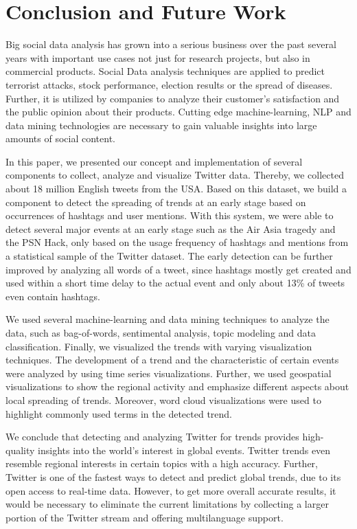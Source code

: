 
\chapter{Conclusion and Future Work}
\label{cha:conclusion-future-work}
Big social data analysis has grown into a serious business over the past several years with important use cases not just for research projects, but also in commercial products. Social Data analysis techniques are applied to predict terrorist attacks, stock performance, election results or the spread of diseases. Further, it is utilized by companies to analyze their customer’s satisfaction and the public opinion about their products. Cutting edge machine-learning, NLP and data mining technologies are necessary to gain valuable insights into large amounts of social content.

In this paper, we presented our concept and implementation of several components to collect, analyze and visualize Twitter data. Thereby, we collected about 18 million English tweets from the USA. Based on this dataset, we build a component to detect the spreading of trends at an early stage based on occurrences of hashtags and user mentions. With this system, we were able to detect several major events at an early stage such as the Air Asia tragedy and the PSN Hack, only based on the usage frequency of hashtags and mentions from a statistical sample of the Twitter dataset. The early detection can be further improved by analyzing all words of a tweet, since hashtags mostly get created and used within a short time delay to the actual event and only about 13\% of tweets even contain hashtags. 

We used several machine-learning and data mining techniques to analyze the data, such as bag-of-words, sentimental analysis, topic modeling and data classification. Finally, we visualized the trends with varying visualization techniques. The development of a trend and the characteristic of certain events were analyzed by using time series visualizations. Further, we used geospatial visualizations to show the regional activity and emphasize different aspects about local spreading of trends. Moreover, word cloud visualizations were used to highlight commonly used terms in the detected trend.

We conclude that detecting and analyzing Twitter for trends provides high-quality insights into the world’s interest in global events. Twitter trends even resemble regional interests in certain topics with a high accuracy. Further, Twitter is one of the fastest ways to detect and predict global trends, due to its open access to real-time data. However, to get more overall accurate results, it would be necessary to eliminate the current limitations by collecting a larger portion of the Twitter stream and offering multilanguage support.

